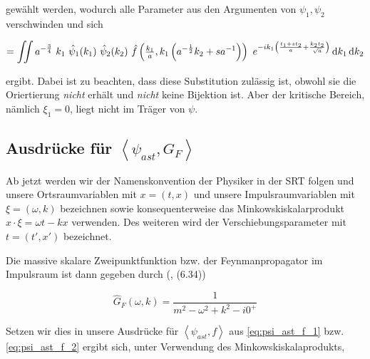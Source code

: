 \documentclass{scrartcl}
\begin{document}
gewählt werden, wodurch alle Parameter aus den Argumenten von $\psi_1, \psi_2$
verschwinden und sich

\begin{align}
\label{eq:psi_ast_f_2}
    =  \iint a^{-\frac{3}{4}}~ k_1~ \hat \psi_1(k_1)~ \hat \psi_2 (k_2)~
    \hat f \left(\tfrac{k_1}{a}, k_1 \left(a^{-\frac{1}{2}}k_2 + s a^{-1}\right)\right)
    ~e^{-i k_1 \left(\frac{t_1+s t_2}{a} + \frac{k_2 t_2}{\sqrt{a}}\right)}
    \mathop{}\!\mathrm{d} k_1 \mathop{}\!\mathrm{d} k_2
\end{align}

ergibt. Dabei ist zu beachten, dass diese Substitution zulässig ist, obwohl sie
die Oriertierung \emph{nicht} erhält und \emph{nicht} keine Bijektion ist. Aber
der kritische Bereich, nämlich $\xi_1 = 0$, liegt nicht im Träger von $\psi$.


\subsection{Ausdrücke für $\left< \psi_{ast}, G_F\right>$} %
\label{sec:psiast_gf}

Ab jetzt werden wir der Namenskonvention der Physiker in der SRT folgen und unsere
Ortsraumvariablen mit $x = (t, x)$ und unsere Impulsraumvariablen mit $\xi = (\omega, k)$
bezeichnen sowie konsequenterweise das Minkowskiskalarprodukt $x \cdot \xi = \omega t - k x$
verwenden. Des weiteren wird der Verschiebungsparameter mit  $t = (t', x')$ bezeichnet.

Die massive skalare Zweipunktfunktion bzw. der Feynmanpropagator im Impulsraum ist dann
gegeben durch (\textcite{Schwartz2014}, (6.34))

\begin{equation}
\label{eq:gf}
    \hat G_F(\omega, k) = \frac{1}{m^2 - \omega^2 + k^2 - i 0^+}
\end{equation}

Setzen wir dies in unsere Ausdrücke für $\left< \psi_{ast}, f\right>$ aus \eqref{eq:psi_ast_f_1}
bzw. \eqref{eq:psi_ast_f_2} ergibt sich, unter Verwendung des Minkowskiskalaprodukts,
\end{document}
